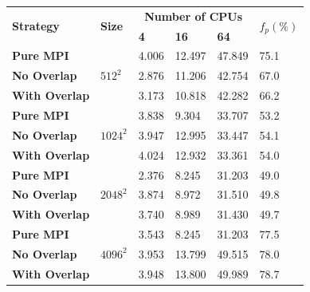 \begin{frame}
  \begin{center}
    \label{TAB:Benchmark:Weak_PURE_MPI}
    \footnotesize
    \begin{tabular}{p{3cm} p{1.5cm} p{1.5cm} p{1.5cm} p{1.5cm} p{1cm}}
      \toprule
      \multirow{2}{*}{\bfseries Strategy}     & \multirow{2}{*}{\bfseries Size} & \multicolumn{3}{c}{\bfseries Number of CPUs}   & \multirow{2}{*}{\bfseries $f_p(\%)$}  \\
                                    &                                  & \bfseries 4   & \bfseries 16   & \bfseries 64  &                                       \\
      \midrule
      \bfseries Pure MPI      & \multirow{3}{*}{$512^2$}      & 4.006  & 12.497  & 47.849                                         & 75.1 \\
      \bfseries No Overlap    &                               & 2.876  & 11.206  & 42.754                                         & 67.0 \\
      \bfseries With Overlap  &                               & 3.173  & 10.818  & 42.282                                         & 66.2 \\
      \midrule
      \bfseries Pure MPI      & \multirow{3}{*}{$1024^2$}     & 3.838  & 9.304   & 33.707                                         & 53.2  \\
      \bfseries No Overlap    &                               & 3.947  & 12.995  & 33.447                                         & 54.1 \\
      \bfseries With Overlap  &                               & 4.024  & 12.932  & 33.361                                         &  54.0 \\
      \midrule
      \bfseries Pure MPI      & \multirow{3}{*}{$2048^2$}     & 2.376  & 8.245   & 31.203                                         &  49.0\\
      \bfseries No Overlap    &                               & 3.874  & 8.972   & 31.510                                         &  49.8 \\
      \bfseries With Overlap  &                               & 3.740  & 8.989   & 31.430                                         &  49.7 \\
      \midrule
      \bfseries Pure MPI      & \multirow{3}{*}{$4096^2$}     & 3.543  & 8.245   & 31.203                                         &  77.5\\
      \bfseries No Overlap    &                               & 3.953  & 13.799  & 49.515                                         &  78.0\\
      \bfseries With Overlap  &                               & 3.948  & 13.800  & 49.989                                         &  78.7 \\
      \bottomrule
    \end{tabular}
  \end{center}
\end{frame}
